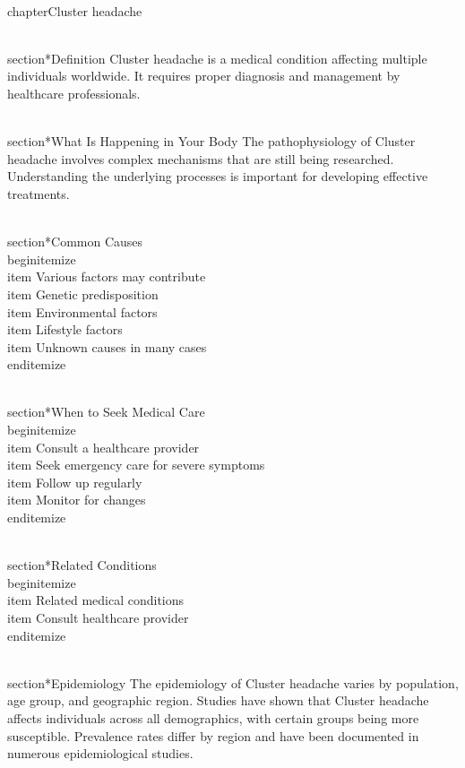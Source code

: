 
\\chapter{Cluster headache}

\\section*{Definition}
Cluster headache is a medical condition affecting multiple individuals worldwide. It requires proper diagnosis and management by healthcare professionals.

\\section*{What Is Happening in Your Body}
The pathophysiology of Cluster headache involves complex mechanisms that are still being researched. Understanding the underlying processes is important for developing effective treatments.

\\section*{Common Causes}
\\begin{itemize}
\\item Various factors may contribute\n  \\item Genetic predisposition\n  \\item Environmental factors\n  \\item Lifestyle factors\n  \\item Unknown causes in many cases
\\end{itemize}

\\section*{When to Seek Medical Care}
\\begin{itemize}
\\item Consult a healthcare provider\n  \\item Seek emergency care for severe symptoms\n  \\item Follow up regularly\n  \\item Monitor for changes
\\end{itemize}

\\section*{Related Conditions}
\\begin{itemize}
\\item Related medical conditions\n  \\item Consult healthcare provider
\\end{itemize}

\\section*{Epidemiology}
The epidemiology of Cluster headache varies by population, age group, and geographic region. Studies have shown that Cluster headache affects individuals across all demographics, with certain groups being more susceptible. Prevalence rates differ by region and have been documented in numerous epidemiological studies.

